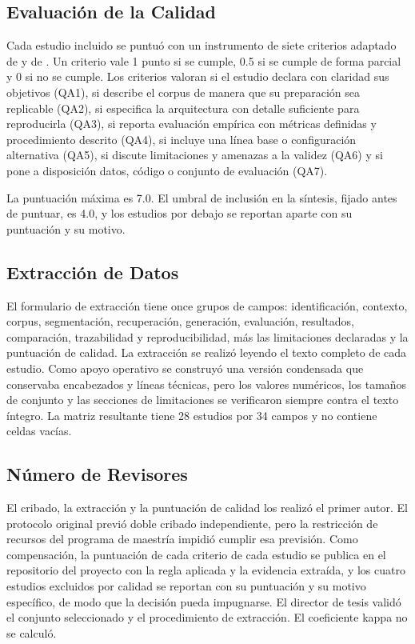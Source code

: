 \documentclass[man,12pt,floatsintext,donotrepeattitle]{apa7}
\begin{document}
\subsection{Evaluación de la Calidad}
Cada estudio incluido se puntuó con un instrumento de siete criterios adaptado de \textcite{kitchenham2007} y de \textcite{dyba2008}. Un criterio vale 1 punto si se cumple, 0.5 si se cumple de forma parcial y 0 si no se cumple. Los criterios valoran si el estudio declara con claridad sus objetivos (QA1), si describe el corpus de manera que su preparación sea replicable (QA2), si especifica la arquitectura con detalle suficiente para reproducirla (QA3), si reporta evaluación empírica con métricas definidas y procedimiento descrito (QA4), si incluye una línea base o configuración alternativa (QA5), si discute limitaciones y amenazas a la validez (QA6) y si pone a disposición datos, código o conjunto de evaluación (QA7).

La puntuación máxima es 7.0. El umbral de inclusión en la síntesis, fijado antes de puntuar, es 4.0, y los estudios por debajo se reportan aparte con su puntuación y su motivo.

\subsection{Extracción de Datos}
El formulario de extracción tiene once grupos de campos: identificación, contexto, corpus, segmentación, recuperación, generación, evaluación, resultados, comparación, trazabilidad y reproducibilidad, más las limitaciones declaradas y la puntuación de calidad. La extracción se realizó leyendo el texto completo de cada estudio. Como apoyo operativo se construyó una versión condensada que conservaba encabezados y líneas técnicas, pero los valores numéricos, los tamaños de conjunto y las secciones de limitaciones se verificaron siempre contra el texto íntegro. La matriz resultante tiene 28 estudios por 34 campos y no contiene celdas vacías.

\subsection{Número de Revisores}
El cribado, la extracción y la puntuación de calidad los realizó el primer autor. El protocolo original previó doble cribado independiente, pero la restricción de recursos del programa de maestría impidió cumplir esa previsión. Como compensación, la puntuación de cada criterio de cada estudio se publica en el repositorio del proyecto con la regla aplicada y la evidencia extraída, y los cuatro estudios excluidos por calidad se reportan con su puntuación y su motivo específico, de modo que la decisión pueda impugnarse. El director de tesis validó el conjunto seleccionado y el procedimiento de extracción. El coeficiente kappa no se calculó.
\end{document}
